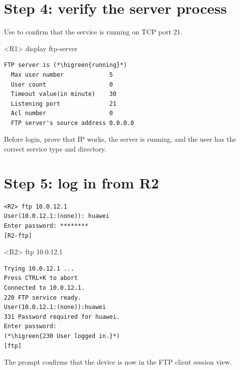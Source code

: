 \section{Step 4: verify the server process}
Use  to confirm that the service is running on TCP port 21.

\begin{vrpbox}{<R1> display ftp-server}
\begin{lstlisting}[style=dcnvrp]
  FTP server is (*\higreen{running}*)
  Max user number             5
  User count                  0
  Timeout value(in minute)    30
  Listening port              21
  Acl number                  0
  FTP server's source address 0.0.0.0
\end{lstlisting}
\end{vrpbox}

\begin{verification}
Before login, prove that IP works, the server is running, and the user has the correct service type and directory.
\end{verification}

\section{Step 5: log in from R2}
\begin{lstlisting}[style=dcnterminal]
<R2> ftp 10.0.12.1
User(10.0.12.1:(none)): huawei
Enter password: ********
[R2-ftp]
\end{lstlisting}

\begin{vrpbox}{<R2> ftp 10.0.12.1}
\begin{lstlisting}[style=dcnvrp]
Trying 10.0.12.1 ...
Press CTRL+K to abort
Connected to 10.0.12.1.
220 FTP service ready.
User(10.0.12.1:(none)):huawei
331 Password required for huawei.
Enter password:
(*\higreen{230 User logged in.}*)
[ftp]
\end{lstlisting}
\end{vrpbox}

The \cmd{[R2-ftp]} prompt confirms that the device is now in the FTP client session view.

